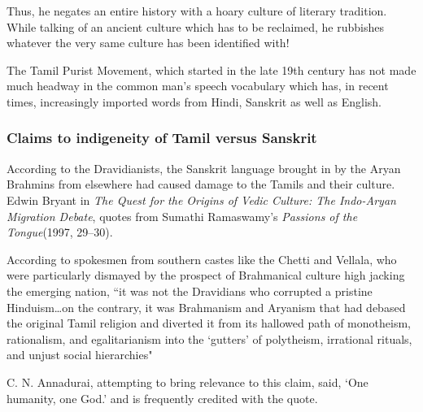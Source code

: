 Thus, he negates an entire history with a hoary culture of literary tradition. While talking of an ancient culture which has to be reclaimed, he rubbishes whatever the very same culture has been identified with!

The Tamil Purist Movement, which started in the late 19th century has not made much headway in the common man’s speech vocabulary which has, in recent times, increasingly imported words from Hindi, Sanskrit as well as English.


\subsubsection*{Claims to indigeneity of Tamil versus Sanskrit}

\vskip -8pt

According to the Dravidianists, the Sanskrit language brought in by the Aryan Brahmins from elsewhere had caused damage to the Tamils and their culture. Edwin Bryant in \textit{The Quest for the Origins of Vedic Culture: The Indo-Aryan Migration Debate}, quotes from Sumathi Ramaswamy’s \textit{Passions of the Tongue}(1997, 29–30).

\begin{myquote}
According to spokesmen from southern castes like the Chetti and Vellala, who were particularly dismayed by the prospect of Brahmanical culture high jacking the emerging nation, “it was not the Dravidians who corrupted a pristine Hinduism…on the contrary, it was Brahmanism and Aryanism that had debased the original Tamil religion and diverted it from its hallowed path of monotheism, rationalism, and egalitarianism into the ‘gutters’ of polytheism, irrational rituals, and unjust social hierarchies"
\end{myquote}

C. N. Annadurai, attempting to bring relevance to this claim, said, ‘One humanity, one God.’ and is frequently credited with the quote.


